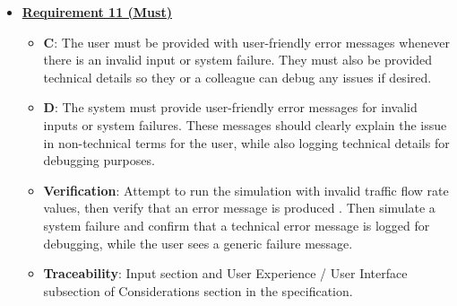 \documentclass{article}
\begin{document}
\begin{itemize}

    \item \textbf{\underline{Requirement 11 (Must)}}
    \begin{itemize}
        \item \textbf{C}: The user must be provided with user-friendly error messages whenever there is an invalid 
        input or system failure. They must also be provided technical details so they or a colleague can debug any 
        issues if desired.
        \item \textbf{D}: The system must provide user-friendly error messages for invalid inputs or system failures. 
        These messages should clearly explain the issue in non-technical terms for the user, while also logging 
        technical details for debugging purposes.
        \item \textbf{Verification}: Attempt to run the simulation with invalid traffic flow rate values, then verify 
        that an error message is produced . Then simulate a system failure and confirm that a technical error message 
        is logged for debugging, while the user sees a generic failure message.
        \item\textbf{Traceability}: Input section and User Experience / User Interface subsection of Considerations 
        section in the specification.
    \end{itemize}
\end{itemize}
\end{document}
